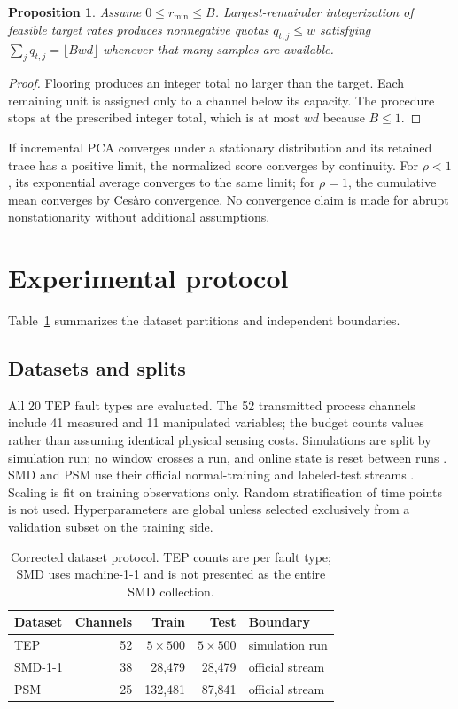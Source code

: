 \documentclass[pdflatex,sn-vancouver-num]{sn-jnl}
\theoremstyle{thmstyleone}
\newtheorem{proposition}{Proposition}
\begin{document}
\begin{proposition}
Assume $0\leq r_{\min}\leq B$. Largest-remainder integerization of feasible
target rates produces nonnegative quotas $q_{t,j}\leq w$ satisfying
$\sum_jq_{t,j}=\lfloor Bwd\rfloor$ whenever that many samples are available.
\end{proposition}
\begin{proof}
Flooring produces an integer total no larger than the target. Each remaining
unit is assigned only to a channel below its capacity. The procedure stops at
the prescribed integer total, which is at most $wd$ because $B\leq1$.
\end{proof}

If incremental PCA converges under a stationary distribution and its retained
trace has a positive limit, the normalized score converges by continuity.
For $\rho<1$, its exponential average converges to the same limit; for
$\rho=1$, the cumulative mean converges by Ces\`aro convergence.
No convergence claim is made for abrupt nonstationarity without additional
assumptions.

\section{Experimental protocol}
Table~\ref{tab:datasets} summarizes the dataset partitions and independent boundaries.

\subsection{Datasets and splits}

All 20 TEP fault types are evaluated. The 52 transmitted process channels
include 41 measured and 11 manipulated variables; the budget counts values
rather than assuming identical physical sensing costs. Simulations are split by simulation run;
no window crosses a run, and online state is reset between runs
\cite{downs1993tep,rieth2017tep}. SMD
and PSM use their official normal-training and labeled-test streams
\cite{su2019omnianomaly,abdulaal2021ransyn}. Scaling is
fit on training observations only. Random stratification of time points is not
used. Hyperparameters are global unless selected exclusively from a validation
subset on the training side.

\begin{table}[t]
\centering
\caption{Corrected dataset protocol. TEP counts are per fault type; SMD uses
machine-1-1 and is not presented as the entire SMD collection.}
\begin{tabular}{@{}lrrrl@{}}
\toprule
Dataset & Channels & Train & Test & Boundary \\
\midrule
TEP & 52 & $5\times500$ & $5\times500$ & simulation run \\
SMD-1-1 & 38 & 28,479 & 28,479 & official stream \\
PSM & 25 & 132,481 & 87,841 & official stream \\
\bottomrule
\end{tabular}
\label{tab:datasets}
\end{table}
\end{document}
